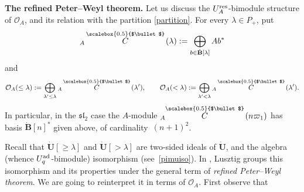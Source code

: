\documentclass[10pt,a4paper]{amsart}
\numberwithin{equation}{section}
\theoremstyle{definition}
\newcommand{\Oo}{{\mathcal O}}
\newcommand{\ra}{\rightarrow}
\newcommand{\smallbullet}{%
\vcenter{\hbox{\,\scalebox{0.5}{$\bullet$}\,}}
}
\begin{document}
{\bf The refined Peter--Weyl theorem.} Let us discuss the $U_A^{\rm res}$-bimodule structure of $\Oo_A$, and its relation with the partition \eqref{partition}. For every $\lambda\in P_+$, put
\begin{equation}\label{AClambda}
{}_A \overset{\raisebox{-1.5pt}{\scriptsize$\smallbullet$}}{C} (\lambda) := \bigoplus_{b\in \dot{\mathbf{B}}[\lambda]} Ab^*
\end{equation}
and
\[\Oo_A(\leq \lambda) := \bigoplus_{\lambda'\leq \lambda} {}_A \overset{\raisebox{-1.5pt}{\scriptsize$\smallbullet$}}{C} (\lambda') ,\qquad \Oo_A(< \lambda) := \bigoplus_{\lambda'< \lambda} {}_A \overset{\raisebox{-1.5pt}{\scriptsize$\smallbullet$}}{C} (\lambda').\]
In particular, in the ${\mathfrak{sl}_2}$ case the $A$-module ${}_A\! \overset{\raisebox{-1.5pt}{\scriptsize$\smallbullet$}}{C} (n\varpi_1)$ has basis $\dot{\mathbf{B}} [n]^*$ given above, of cardinality~${(n+1)^2}$.

Recall that $\dot{\mathbf{U}} [\geq \lambda]$ and $\dot{\mathbf{U}} [> \lambda]$ are two-sided ideals of $\dot{\mathbf{U}}$, and the algebra (whence $U_q^{\rm ad}$-bimodule) isomorphism \smash{$\bar{\pi}_\lambda\colon \dot{\mathbf{U}} [\geq \lambda]/ \dot{\mathbf{U}} [> \lambda] \ra {\rm End}(V_\lambda)$} (see~\eqref{pimuiso}). In \cite[Section~29.3]{Lusztig}, Lusz\-tig groups this isomorphism and its properties under the general term of {\it refined Peter--Weyl theorem}. We are going to reinterpret it in terms of $\Oo_A$. First observe that
\end{document}
